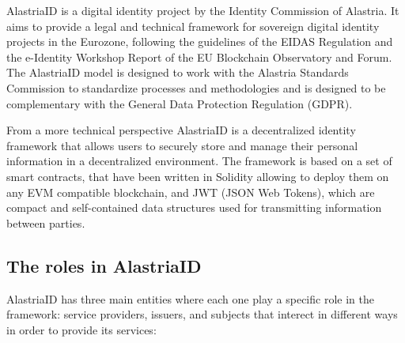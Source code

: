 \documentclass[target=mst,aauheader=]{thud}
\begin{document}
AlastriaID is a digital identity project by the Identity Commission of Alastria. It aims to provide a legal and technical framework for sovereign digital identity projects in the Eurozone, following the guidelines of the EIDAS Regulation and the e-Identity Workshop Report of the EU Blockchain Observatory and Forum. The AlastriaID model is designed to work with the Alastria Standards Commission to standardize processes and methodologies and is designed to be complementary with the General Data Protection Regulation (GDPR).\par
From a more technical perspective AlastriaID is a decentralized identity framework that allows users to securely store and manage their personal information in a decentralized environment. The framework is based on a set of smart contracts, that have been written in Solidity allowing to deploy them on any EVM compatible blockchain, and JWT (JSON Web Tokens), which are compact and self-contained data structures used for transmitting information between parties. 

\subsection{The roles in AlastriaID}

AlastriaID has three main entities where each one play a specific role in the framework: service providers, issuers, and subjects that interect in different ways in order to provide its services:
\end{document}
